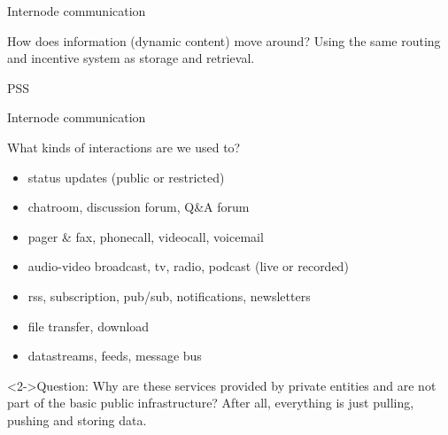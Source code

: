 \documentclass{beamer}
\begin{document}
\begin{section}{Internode communication}

\begin{frame}
 \begin{block}{How does information (dynamic content) move around?}
 Using the same routing and incentive system as storage and retrieval.
 \end{block}
\end{frame}





\begin{frame}{PSS}
\end{frame}

\begin{frame}{Internode communication}
\begin{block}{What kinds of interactions are we used to?}
 \begin{itemize}
    \item status updates (public or restricted)
    \item chatroom, discussion forum, Q\&A forum
    \item pager \& fax, phonecall, videocall, voicemail
    \item audio-video broadcast, tv, radio, podcast (live or recorded)
    \item rss, subscription, pub/sub, notifications, newsletters
    \item file transfer, download
    \item datastreams, feeds, message bus
 \end{itemize}
\end{block}
\begin{block}<2->{Question:}
 Why are these services provided by private entities and are not part of the basic public infrastructure? After all, everything is just pulling, pushing and storing data.
\end{block}
\end{frame}


\end{section}
\end{document}
